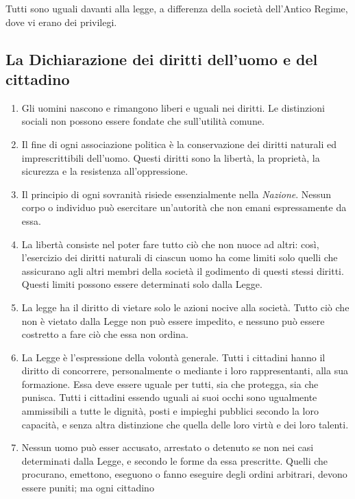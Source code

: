 \documentclass[a4paper]{article}
\begin{document}
Tutti sono uguali davanti alla legge, a differenza della società dell'Antico Regime,
dove vi erano dei privilegi.

\subsection{La Dichiarazione dei diritti dell'uomo e del cittadino}

\begin{enumerate}
    \item Gli uomini nascono e rimangono liberi e uguali nei diritti. Le distinzioni sociali
    non possono essere fondate che sull'utilità comune.
    \item Il fine di ogni associazione politica è la conservazione dei diritti naturali ed
    imprescrittibili dell'uomo. Questi diritti sono la libertà, la proprietà, la sicurezza e la
    resistenza all'oppressione.
    \item Il principio di ogni sovranità     risiede essenzialmente nella \textit{Nazione}.
    Nessun corpo o individuo può esercitare un'autorità che non emani espressamente da essa.
    \item La libertà consiste nel poter fare tutto ciò che non nuoce ad altri: così, l'esercizio
    dei diritti naturali di ciascun uomo ha come limiti solo quelli che assicurano agli altri
    membri della società il godimento di questi stessi diritti. Questi limiti possono essere
    determinati solo dalla Legge.
    \item  La legge ha il diritto di vietare solo le azioni nocive alla società. Tutto ciò che non
    è vietato dalla Legge non può essere impedito, e nessuno può essere costretto a fare ciò
    che essa non ordina.
    \item La Legge è l'espressione della volontà generale. Tutti i cittadini hanno il diritto di
    concorrere, personalmente o mediante i loro rappresentanti, alla sua formazione. Essa
    deve essere uguale per tutti, sia che protegga, sia che punisca. Tutti i cittadini essendo
    uguali ai suoi occhi sono ugualmente ammissibili a tutte le dignità, posti e impieghi
    pubblici secondo la loro capacità, e senza altra distinzione che quella delle loro virtù e
    dei loro talenti.
    \item Nessun uomo può esser accusato, arrestato o detenuto se non nei casi determinati
    dalla Legge, e secondo le forme da essa prescritte. Quelli che procurano, emettono,
    eseguono o fanno eseguire degli ordini arbitrari, devono essere puniti; ma ogni cittadino

\end{enumerate}
\end{document}
